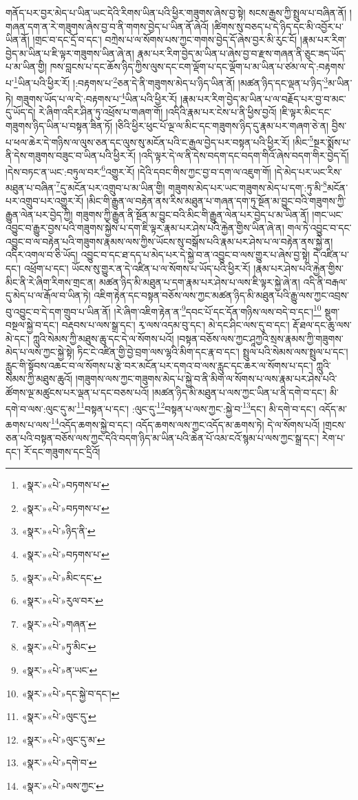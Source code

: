 གནོད་པར་བྱར་མེད་པ་ཡིན་ཡང་དེའི་རིགས་ཡིན་པའི་ཕྱིར་གཟུགས་ཞེས་བྱ་སྟེ། སངས་རྒྱས་ཀྱི་སྤྲུལ་པ་བཞིན་ནོ། །གཞན་དག་ན་རེ་གཟུགས་ཞེས་བྱ་བ་ནི་གགས་བྱེད་པ་ཡིན་ནོ་ཞེའོ། །ཚིགས་སུ་བཅད་པ་དེ་ཉིད་དང་མི་འབྱོར་པ་ཡིན་ནོ། །གྲང་བ་དང་དྲོ་བ་དང་། བཀྲེས་པ་ལ་སོགས་པས་ཀྱང་གགས་བྱེད་དོ་ཞེས་བྱར་མི་རུང་ངོ། །རྣམ་པར་རིག་བྱེད་མ་ཡིན་པ་ཇི་ལྟར་གཟུགས་ཡིན་ཞེ་ན། རྣམ་པར་རིག་བྱེད་མ་ཡིན་པ་ཞེས་བྱ་བ་རྫས་གཞན་ནི་ཅུང་ཟད་ཡོད་པ་མ་ཡིན་གྱི། ཁས་བླངས་པ་དང་ཆོས་ཉིད་ཀྱིས་ལུས་དང་ངག་ལྡོག་པ་དང་ལྡོག་པ་མ་ཡིན་པ་ཙམ་ལ་དེ་:བརྟགས་པ་\footnote{«སྣར་»«པེ་»བཏགས་པ་}ཡིན་པའི་ཕྱིར་རོ། །:བརྟགས་པ་\footnote{«སྣར་»«པེ་»བཏགས་པ་}ཅན་དེ་ནི་གཟུགས་མེད་པ་ཉིད་ཡིན་ནོ། །མཚན་ཉིད་དང་ལྡན་པ་ཉིད་\footnote{«སྣར་»«པེ་»ཉིད་ནི་}མ་ཡིན་ཏེ། གཟུགས་ཡོད་པ་ལ་དེ་:བརྟགས་པ་\footnote{«སྣར་»«པེ་»བཏགས་པ་}ཡིན་པའི་ཕྱིར་རོ། །རྣམ་པར་རིག་བྱེད་མ་ཡིན་པ་ལ་བརྗོད་པར་བྱ་བ་མང་དུ་ཡོད་དེ། རེ་ཞིག་འདིར་ཤིན་ཏུ་འཕྲོས་པ་གཞག་གོ། །འདིའི་རྣམ་པར་ངེས་པ་ནི་ཕྱིས་བྱའོ། །ཇི་ལྟར་མིང་དང་གཟུགས་ཉིད་ཡིན་པ་བསྟན་ཟིན་ཏོ། །ཅིའི་ཕྱིར་ཕུང་པོ་ལྔ་ལ་མིང་དང་གཟུགས་ཉིད་དུ་རྣམ་པར་གཞག་ཅེ་ན། བྱིས་པ་ཕལ་ཆེར་དེ་གཉིས་ལ་ལུས་ཅན་དང་ལུས་སུ་མངོན་པའི་ང་རྒྱལ་བྱེད་པར་བསྟན་པའི་ཕྱིར་རོ། །མིང་\footnote{«སྣར་»«པེ་»མིང་དང་}སྔར་སྨོས་པ་ནི་དེས་གཟུགས་བཟུང་བ་ཡིན་པའི་ཕྱིར་རོ། །འདི་ལྟར་དེ་ལ་ནི་དེས་བདག་དང་བདག་གིའོ་ཞེས་བདག་གིར་བྱེད་དོ། །དེས་བཏང་ན་ཡང་:བཏུལ་བར་\footnote{«སྣར་»«པེ་»རུལ་བར་}འགྱུར་རོ། །དེའི་དབང་གིས་ཀྱང་བྱ་བ་དག་ལ་འཇུག་གོ། །དེ་མེད་པར་ཡང་རིས་མཐུན་པ་བཞིན་\footnote{«སྣར་»«པེ་»གཞན་}དུ་མངོན་པར་འགྲུབ་པ་མ་ཡིན་གྱི། གཟུགས་མེད་པར་ཡང་གཟུགས་མེད་པ་དག་:ཏུ་མི་\footnote{«སྣར་»«པེ་»ཏུ་མིང་}མངོན་པར་འགྲུབ་པར་འགྱུར་རོ། །མིང་གི་རྒྱུན་ལ་བརྟེན་ནས་རིས་མཐུན་པ་གཞན་དག་ཏུ་སྔོན་མ་བྱུང་བའི་གཟུགས་ཀྱི་རྒྱུན་ལེན་པར་བྱེད་ཀྱི། གཟུགས་ཀྱི་རྒྱུན་ནི་སྔོན་མ་བྱུང་བའི་མིང་གི་རྒྱུན་ལེན་པར་བྱེད་པ་མ་ཡིན་ནོ། །གང་ཡང་འབྱུང་བ་རྒྱུར་བྱས་པའི་གཟུགས་སྐྱེས་པ་དག་ཇི་ལྟར་རྣམ་པར་ཤེས་པའི་རྐྱེན་གྱིས་ཡིན་ཞེ་ན། གལ་ཏེ་འབྱུང་བ་དང་འབྱུང་བ་ལ་བརྟེན་པའི་གཟུགས་རྣམས་ལས་ཀྱིས་ཡོངས་སུ་བསྒོས་པའི་རྣམ་པར་ཤེས་པ་ལ་བརྟེན་ནས་སྐྱེ་ན། འདིར་འགལ་བ་ཅི་ཡོད། འབྱུང་བ་དང་ཐ་དད་པ་མེད་པར་དེ་སྐྱེ་བ་ན་འབྱུང་བ་ལས་གྱུར་པ་ཞེས་བྱ་སྟེ། དེ་འཛིན་པ་དང་། འཕྲོག་པ་དང་། ཡོངས་སུ་གྱུར་ན་དེ་འཛིན་པ་ལ་སོགས་པ་ཡོད་པའི་ཕྱིར་རོ། །རྣམ་པར་ཤེས་པའི་རྐྱེན་གྱིས་མིང་ནི་རེ་ཞིག་རིགས་གྲང་ན། མཚན་ཉིད་མི་མཐུན་པ་དག་རྣམ་པར་ཤེས་པ་ལས་ཇི་ལྟར་སྐྱེ་ཞེ་ན། འདི་ནི་བརྒལ་དུ་མེད་པ་ལ་རྒོལ་བ་ཡིན་ཏེ། འཇིག་རྟེན་དང་བསྟན་བཅོས་ལས་ཀྱང་མཚན་ཉིད་མི་མཐུན་པའི་རྒྱུ་ལས་ཀྱང་འབྲས་བུ་འབྱུང་བ་དེ་དག་གྲུབ་པ་ཡིན་ནོ། །རེ་ཞིག་འཇིག་རྟེན་ན་\footnote{«སྣར་»«པེ་»ན་ཡང་}དབང་པོ་དང་དོན་གཉིས་ལས་བདེ་བ་དང་།\footnote{«སྣར་»«པེ་»དང་སྐྱེ་བ་དང་།} སྡུག་བསྔལ་སྐྱེ་བ་དང་། བརྡབས་པ་ལས་སྒྲ་དང་། རྭ་ལས་འདམ་བུ་དང་། མེ་དང་ཤིང་ལས་དུ་བ་དང་། རྡོ་ཐལ་དང་ཆུ་ལས་མེ་དང་། ཀླུའི་སེམས་ཀྱི་མཐུས་ཆུ་དང་དེ་ལ་སོགས་པའོ། །བསྟན་བཅོས་ལས་ཀྱང་ཤཱཀྱའི་སྲས་རྣམས་ཀྱི་གཟུགས་མེད་པ་ལས་ཀྱང་སྐྱེ་སྟེ། ཏིང་ངེ་འཛིན་གྱི་བྱེ་བྲག་ལས་ལྷའི་མིག་དང་རྣ་བ་དང་། སྤྲུལ་པའི་སེམས་ལས་སྤྲུལ་པ་དང་། རླུང་གི་སྟོབས་འཆང་བ་ལ་སོགས་པ་རྩེ་བར་མངོན་པར་དགའ་བ་ལས་རླུང་དང་ཆར་ལ་སོགས་པ་དང་། ཀླུའི་སེམས་ཀྱི་མཐུས་ཆུའོ། །གཟུགས་ལས་ཀྱང་གཟུགས་མེད་པ་སྐྱེ་བ་ནི་མིག་ལ་སོགས་པ་ལས་རྣམ་པར་ཤེས་པའི་ཚོགས་ལྔ་མཚུངས་པར་ལྡན་པ་དང་བཅས་པའོ། །མཚན་ཉིད་མི་མཐུན་པ་ལས་ཀྱང་ཡིན་པ་ནི་དགེ་བ་དང་། མི་དགེ་བ་ལས་:ལུང་དུ་མ་\footnote{«སྣར་»«པེ་»ལུང་དུ་}བསྟན་པ་དང་། :ལུང་དུ་\footnote{«སྣར་»«པེ་»ལུང་དུ་མ་}བསྟན་པ་ལས་ཀྱང་:སྐྱེ་བ་\footnote{«སྣར་»«པེ་»དགེ་བ་}དང་། མི་དགེ་བ་དང་། འདོད་མ་ཆགས་པ་ལས་\footnote{«སྣར་»«པེ་»ལས་ཀྱང་}འདོད་ཆགས་སྐྱེ་བ་དང་། འདོད་ཆགས་ལས་ཀྱང་འདོད་མ་ཆགས་ཏེ། དེ་ལ་སོགས་པའོ། །གྲངས་ཅན་པའི་བསྟན་བཅོས་ལས་ཀྱང་དེའི་བདག་ཉིད་མ་ཡིན་པའི་ཆེན་པོ་འམ་ངའོ་སྙམ་པ་ལས་ཀྱང་སྒྲ་དང་། རེག་པ་དང་། རོ་དང་གཟུགས་དང་དྲིའོ། 